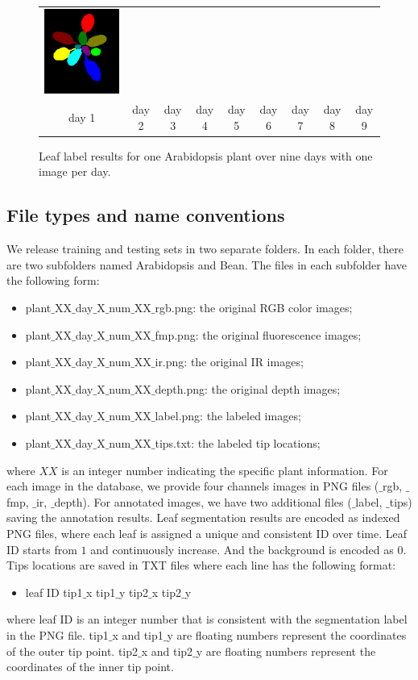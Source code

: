 \begin{figure}[h]
\begin{centering}
\begin{tabular}{@{}c@{} c@{} c@{} c@{} c@{} c@{} c@{} c@{} c@{}}
\includegraphics[width=.11\textwidth]{Figures/labelExample/plant_1_day_9_num_13.png}\\
  day 1 & day 2 & day 3 & day 4 & day 5 & day 6 & day 7 & day 8 & day 9 \\
\end{tabular}
\caption{Leaf label results for one Arabidopsis plant over nine days with one image per day. }
\label{fig:LabelExample}
\end{centering}
\end{figure}



\subsection{File types and name conventions}
We release training and testing sets in two separate folders.
In each folder, there are two subfolders named Arabidopsis and Bean.
The files in each subfolder have the following form:
\begin{itemize}
  \item plant$\_$XX$\_$day$\_$X$\_$num$\_$XX$\_$rgb.png: the original RGB color images;
  \item plant$\_$XX$\_$day$\_$X$\_$num$\_$XX$\_$fmp.png: the original fluorescence images;
  \item plant$\_$XX$\_$day$\_$X$\_$num$\_$XX$\_$ir.png: the original IR images;
  \item plant$\_$XX$\_$day$\_$X$\_$num$\_$XX$\_$depth.png: the original depth images;
  \item plant$\_$XX$\_$day$\_$X$\_$num$\_$XX$\_$label.png: the labeled images;
  \item plant$\_$XX$\_$day$\_$X$\_$num$\_$XX$\_$tips.txt: the labeled tip locations;
\end{itemize}
where $XX$ is an integer number indicating the specific plant information.
For each image in the database, we provide four channels images in PNG files ($\_$rgb, $\_$fmp, $\_$ir, $\_$depth).
For annotated images, we have two additional files ($\_$label, $\_$tips) saving the annotation results.
Leaf segmentation results are encoded as indexed PNG files, where each leaf is assigned a unique and consistent ID over time.
Leaf ID starts from $1$ and continuously increase.
And the background is encoded as $0$.
Tips locations are saved in TXT files where each line has the following format:
\begin{itemize}
  \item leaf ID \quad tip1$\_$x \quad tip1$\_$y \quad tip2$\_$x \quad  tip2$\_$y
\end{itemize}
where leaf ID is an integer number that is consistent with the segmentation label in the PNG file.
tip1$\_$x and tip1$\_$y are floating numbers represent the coordinates of the outer tip point.
tip2$\_$x and tip2$\_$y are floating numbers represent the coordinates of the inner tip point.


